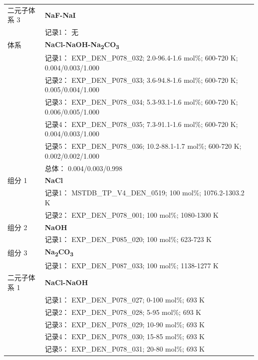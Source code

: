 \documentclass[12pt]{article}
\begin{document}
{\begin{longtable}[]{@{}
  >{\raggedright\arraybackslash}p{}
  >{\raggedright\arraybackslash}p{}@{}}
二元子体系 3 & \textbf{NaF-NaI} \\
 & 记录1： 无 \\
\midrule
体系 & \textbf{NaCl-NaOH-Na\textsubscript{2}CO\textsubscript{3}} \\
 & 记录1： EXP\_DEN\_P078\_032; 2.0-96.4-1.6 mol\%; 600-720 K; 0.004/0.003/1.000 \\
 & 记录2： EXP\_DEN\_P078\_033; 3.6-94.8-1.6 mol\%; 600-720 K; 0.005/0.004/1.000 \\
 & 记录3： EXP\_DEN\_P078\_034; 5.3-93.1-1.6 mol\%; 600-720 K; 0.006/0.005/1.000 \\
 & 记录4： EXP\_DEN\_P078\_035; 7.3-91.1-1.6 mol\%; 600-720 K; 0.004/0.003/1.000 \\
 & 记录5： EXP\_DEN\_P078\_036; 10.2-88.1-1.7 mol\%; 600-720 K; 0.002/0.002/1.000 \\
 & 总体： 0.004/0.003/0.998  \\

组分 1  & \textbf{NaCl} \\
 & 记录1： MSTDB\_TP\_V4\_DEN\_0519; 100 mol\%; 1076.2-1303.2 K \\
 & 记录2： EXP\_DEN\_P078\_001; 100 mol\%; 1080-1300 K  \\

组分 2  & \textbf{NaOH} \\
 & 记录1： EXP\_DEN\_P085\_020; 100 mol\%; 623-723 K  \\

组分 3  & \textbf{Na\textsubscript{2}CO\textsubscript{3}} \\
 & 记录1： EXP\_DEN\_P087\_033; 100 mol\%; 1138-1277 K  \\

二元子体系 1  & \textbf{NaCl-NaOH} \\
 & 记录1： EXP\_DEN\_P078\_027; 0-100 mol\%; 693 K \\
 & 记录2： EXP\_DEN\_P078\_028; 5-95 mol\%; 693 K \\
 & 记录3： EXP\_DEN\_P078\_029; 10-90 mol\%; 693 K \\
 & 记录4： EXP\_DEN\_P078\_030; 15-85 mol\%; 693 K \\
 & 记录5： EXP\_DEN\_P078\_031; 20-80 mol\%; 693 K  \\


\end{longtable}}
\end{document}
